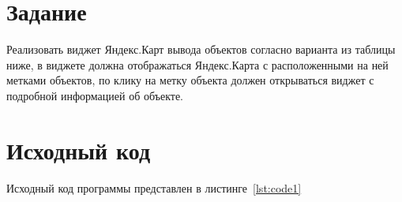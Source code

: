 \documentclass[a4paper, 14pt]{extarticle}
\begin{document}
\renewcommand{\ttdefault}{pcr}

\setlength{\tabcolsep}{3pt}
\newpage
\setcounter{page}{2}

\section{Задание}\label{Sect::task}
Реализовать виджет Яндекс.Карт вывода объектов согласно варианта из
таблицы ниже, в виджете должна отображаться Яндекс.Карта с расположенными
на ней метками объектов, по клику на метку объекта должен открываться виджет с
подробной информацией об объекте.
\newpage
\section{Исходный код}

Исходный код программы представлен в листинге~\ref{lst:code1}
\end{document}
